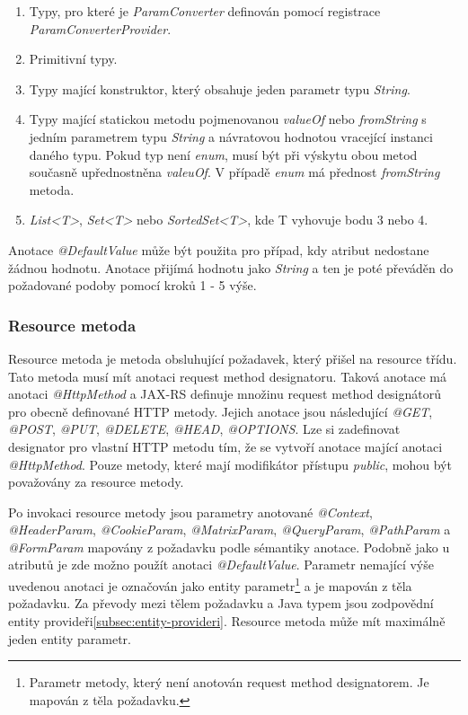 \documentclass[11pt,twoside,a4paper]{book}
\begin{document}
\begin{enumerate}
  \item Typy, pro které je {\em ParamConverter} definován pomocí registrace
  {\em ParamConverterProvider}.
  \item Primitivní typy.
  \item Typy mající konstruktor, který obsahuje jeden parametr typu {\em
  String}.
  \item Typy mající statickou metodu pojmenovanou {\em valueOf} nebo {\em
  fromString} s jedním parametrem typu {\em String} a návratovou hodnotou
  vracející instanci daného typu. Pokud typ není {\em enum}, musí být při
  výskytu obou metod současně upřednostněna {\em valeuOf}. V případě {\em enum}
  má přednost {\em fromString} metoda.
  \item {\em List<T>}, {\em Set<T>} nebo {\em SortedSet<T>}, kde T vyhovuje bodu
  3 nebo 4.
\end{enumerate}

Anotace {\em @DefaultValue} může být použita pro případ, kdy atribut nedostane
žádnou hodnotu.
Anotace přijímá hodnotu jako {\em String} a ten je poté převáděn do požadované
podoby pomocí kroků 1 - 5 výše.

\subsubsection{Resource metoda}
\label{subsec:resource-metoda}

Resource metoda je metoda obsluhující požadavek, který přišel na resource třídu. Tato metoda
musí mít anotaci request method designatoru. Taková anotace má anotaci {\em
@HttpMethod} a JAX-RS definuje množinu request method designátorů pro obecně
definované HTTP metody.
Jejich anotace jsou následující {\em @GET}, {\em @POST}, {\em @PUT}, {\em
@DELETE}, {\em @HEAD}, {\em @OPTIONS}.
Lze si zadefinovat designator pro vlastní HTTP metodu tím, že se vytvoří anotace mající
anotaci {\em @HttpMethod}. Pouze metody, které mají modifikátor přístupu {\em
public}, mohou být považovány za resource metody.

Po invokaci resource metody jsou parametry anotované {\em @Context}, {\em @HeaderParam},
{\em @CookieParam}, {\em @MatrixParam}, {\em @QueryParam}, {\em @PathParam} a {\em @FormParam} mapovány z
požadavku podle sémantiky anotace. Podobně jako u atributů je zde možno použít anotaci
{\em @DefaultValue}. Parametr nemající výše uvedenou anotaci je označován jako
entity parametr\footnote{Parametr metody, který není anotován request method
designatorem. Je mapován z těla požadavku.} a je mapován z těla požadavku.
Za převody mezi tělem požadavku a Java typem jsou zodpovědní entity
provideři\ref{subsec:entity-provideri}.
Resource metoda může mít maximálně jeden entity parametr.
\end{document}
